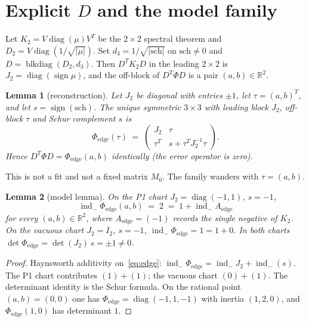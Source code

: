 \documentclass[11pt]{article}
\newtheorem{lemma}{Lemma}
\theoremstyle{remark}
\newcommand{\R}{\mathbb{R}}
\newcommand{\indm}{\operatorname{ind}_{-}}
\begin{document}
\section{Explicit $D$ and the model family}\label{sec:D}

Let $K_{2}=V\operatorname{diag}(\mu)V^{T}$ be the $2\times 2$
spectral theorem and $D_{2}=V\operatorname{diag}(1/\sqrt{|\mu|})$.
Set $d_{3}=1/\sqrt{|\mathrm{sch}|}$ on $\mathrm{sch}\neq 0$ and
$D=\operatorname{blkdiag}(D_{2},d_{3})$.
Then $D^{T}K_{2}D$ in the leading $2\times 2$ is
$J_{2}=\operatorname{diag}(\operatorname{sign}\mu)$, and the
off-block of $D^{T}\Phi D$ is a pair $(a,b)\in\R^{2}$.

\begin{lemma}[reconstruction]\label{lem:recon}
Let $J_{2}$ be diagonal with entries $\pm 1$, let
$\tau=(a,b)^{T}$, and let $s=\operatorname{sign}(\mathrm{sch})$.
The unique symmetric $3\times 3$ with leading block $J_{2}$,
off-block $\tau$ and Schur complement $s$ is
\begin{equation}\label{eq:edge}
\Phi_{\mathrm{edge}}(\tau)
\;=\;
\begin{pmatrix}
J_{2} & \tau\\
\tau^{T} & s+\tau^{T}J_{2}^{-1}\tau
\end{pmatrix}.
\end{equation}
Hence $D^{T}\Phi D=\Phi_{\mathrm{edge}}(a,b)$ identically
(the error operator is zero).
\end{lemma}

This is not a fit and not a fixed matrix $M_{0}$.
The family wanders with $\tau=(a,b)$.

\begin{lemma}[model lemma]\label{lem:model}
On the P1 chart $J_{2}=\operatorname{diag}(-1,1)$, $s=-1$,
\[
\indm\Phi_{\mathrm{edge}}(a,b)
\;=\;
2
\;=\;
1+\indm A_{\mathrm{edge}}
\]
for every $(a,b)\in\R^{2}$, where $A_{\mathrm{edge}}=(-1)$
records the single negative of $K_{2}$.
On the vacuous chart $J_{2}=I_{2}$, $s=-1$,
$\indm\Phi_{\mathrm{edge}}=1=1+0$.
In both charts $\det\Phi_{\mathrm{edge}}=\det(J_{2})\,s=\pm 1\neq 0$.
\end{lemma}

\begin{proof}
Haynsworth additivity on~\eqref{eq:edge}:
$\indm\Phi_{\mathrm{edge}}=\indm J_{2}+\indm(s)$.
The P1 chart contributes $(1)+(1)$; the vacuous chart $(0)+(1)$.
The determinant identity is the Schur formula.
On the rational point $(a,b)=(0,0)$ one has
$\Phi_{\mathrm{edge}}=\operatorname{diag}(-1,1,-1)$ with inertia
$(1,2,0)$, and $\Phi_{\mathrm{edge}}(1,0)$ has determinant $1$.
\end{proof}
\end{document}
